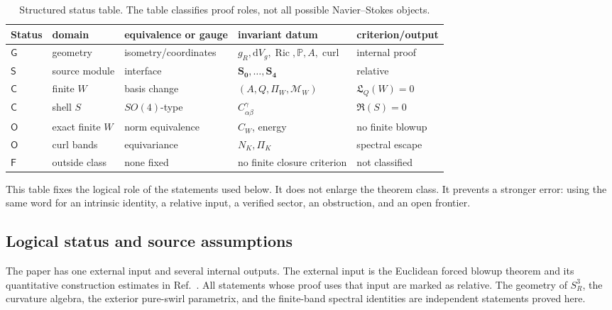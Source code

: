\documentclass[aps,prd,reprint,superscriptaddress,nofootinbib,floatfix]{revtex4-2}
\theoremstyle{definition}
\theoremstyle{remark}
\newcommand{\dd}{\mathrm{d}}
\newcommand{\Ric}{\operatorname{Ric}}
\newcommand{\cM}{\mathcal{M}}
\newcommand{\PP}{\mathbb{P}}
\newcommand{\curl}{\operatorname{curl}}
\begin{document}
\begin{table}[t]
	\caption{Structured status table.  The table classifies proof roles, not all possible Navier--Stokes objects.}
	\label{tab:structured-status-table}
	\footnotesize
	\begin{tabular}{lllll}
		\toprule
		Status        & domain             & equivalence or gauge & invariant datum                      & criterion/output        \\
		\midrule
		\(\mathsf G\) & geometry           & isometry/coordinates & \(g_R,\dd V_g,\Ric,\PP,A,\curl\)     & internal proof         \\
		\(\mathsf S\) & source module      & interface            & \(\mathbf{S_0},\ldots,\mathbf{S_4}\) & relative               \\
		\(\mathsf C\) & finite \(W\)       & basis change         & \((A,Q,\Pi_W,\cM_W)\)                & \(\mathfrak L_Q(W)=0\) \\
		\(\mathsf C\) & shell \(S\)        & \(SO(4)\)-type       & \(C_{\alpha\beta}^{\gamma}\)         & \(\mathfrak R(S)=0\)   \\
		\(\mathsf O\) & exact finite \(W\) & norm equivalence     & \(C_W\), energy                      & no finite blowup       \\
		\(\mathsf O\) & curl bands         & equivariance         & \(N_K,\Pi_K\)                        & spectral escape        \\
		\(\mathsf F\) & outside class      & none fixed           & no finite closure criterion          & not classified         \\
		\bottomrule
	\end{tabular}
\end{table}

This table fixes the logical role of the statements used below.  It does not enlarge the theorem class.  It prevents a stronger error: using the same word for an intrinsic identity, a relative input, a verified sector, an obstruction, and an open frontier.

\subsection{Logical status and source assumptions}\label{subsec:sourcecontract}

The paper has one external input and several internal outputs.  The external input is the Euclidean forced blowup theorem and its quantitative construction estimates in Ref.~\cite{OpenAI2026Paper}.  All statements whose proof uses that input are marked as relative.  The geometry of $S^3_R$, the curvature algebra, the exterior pure-swirl parametrix, and the finite-band spectral identities are independent statements proved here.
\end{document}
